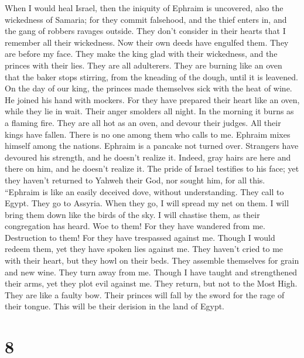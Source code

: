  When I would heal Israel, then the iniquity of Ephraim is
uncovered, also the wickedness of Samaria; for they commit falsehood,
and the thief enters in, and the gang of robbers ravages outside.
 They don't consider in their hearts that I remember all
their wickedness. Now their own deeds have engulfed them. They are
before my face.  They make the king glad with their
wickedness, and the princes with their lies.  They are all
adulterers. They are burning like an oven that the baker stops stirring,
from the kneading of the dough, until it is leavened.  On
the day of our king, the princes made themselves sick with the heat of
wine. He joined his hand with mockers.  For they have
prepared their heart like an oven, while they lie in wait. Their anger
smolders all night. In the morning it burns as a flaming fire.
 They are all hot as an oven, and devour their judges. All
their kings have fallen. There is no one among them who calls to me.
 Ephraim mixes himself among the nations. Ephraim is a
pancake not turned over.  Strangers have devoured his
strength, and he doesn't realize it. Indeed, gray hairs are here and
there on him, and he doesn't realize it.  The pride of
Israel testifies to his face; yet they haven't returned to Yahweh their
God, nor sought him, for all this.  ``Ephraim is like an
easily deceived dove, without understanding. They call to Egypt. They go
to Assyria.  When they go, I will spread my net on them.
I will bring them down like the birds of the sky. I will chastise them,
as their congregation has heard.  Woe to them! For they
have wandered from me. Destruction to them! For they have trespassed
against me. Though I would redeem them, yet they have spoken lies
against me.  They haven't cried to me with their heart,
but they howl on their beds. They assemble themselves for grain and new
wine. They turn away from me.  Though I have taught and
strengthened their arms, yet they plot evil against me. 
They return, but not to the Most High. They are like a faulty bow. Their
princes will fall by the sword for the rage of their tongue. This will
be their derision in the land of Egypt.

\hypertarget{section-7}{%
\section{8}\label{section-7}}

